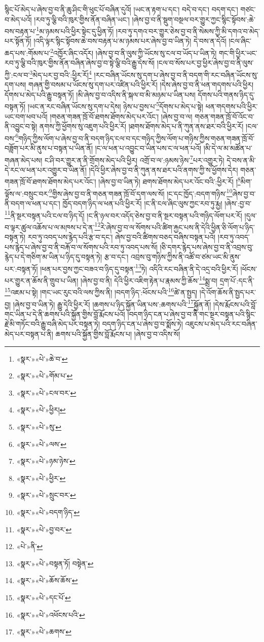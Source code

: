 སྙིང་པོ་མེད་པ་ཞེས་བྱ་བ་ནི་ཆུ་ཤིང་གི་ཕུང་པོ་བཞིན་དུའོ། །ཡང་ན་རྟག་པ་དང་། བདེ་བ་དང་། བདག་དང་། གཙང་བ་མེད་པའོ། །རབ་ཏུ་ལྕི་བའི་ཁུར་གྱིས་ནོན་བཞིན་ཡང་། །ཞེས་བྱ་བ་ནི་སྡུག་བསྔལ་བར་གྱུར་ཀྱང་སྙིང་སྟོབས་:ཆེ་བས་བརྟན་པ་\footnote{«སྣར་»«པེ་»ཆེ་བ་}མ་ཉམས་པའི་ཕྱིར་སྟེང་དུ་ཕྱིན་ཏོ། །རབ་ཏུ་དགའ་བར་གྱུར་ཅེས་བྱ་བ་ནི་སེམས་ཀྱི་མི་དགའ་བ་མེད་པར་སྟོན་ཏོ། །འདི་ལྟར་སྙིང་སྟོབས་ཆེ་བས་བརྟན་པ་མ་ཉམས་པར་ཞེས་བྱ་བ་ཡིན་ཏེ། དེ་བས་ན་དེའོ། །ངལ་ཞིང་ཆད་པས་:གོམས་པ་\footnote{«སྣར་»«པེ་»གོམ་པ་}འཁྱོར་ཞིང་འདོར། །ཞེས་བྱ་བ་ནི་ལུས་ཀྱི་ཡོངས་སུ་ངལ་བ་ཡོད་པ་ཡིན་ཏེ། གང་གི་ཕྱིར་ཡང་རབ་ཏུ་ལྕི་བའི་ཁུར་གྱིས་ནོན་བཞིན་ཞེས་བྱ་བ་སྟེ་ལྕི་བའི་རྒྱུ་དེས་སོ། །ངལ་བ་སོས་པར་བྱ་ཕྱིར་ཞེས་བྱ་བ་ནི་ལུས་ཀྱི་:ངལ་བ་\footnote{«སྣར་»«པེ་»ངལ་བར་}མེད་པར་བྱ་བའི་:ཕྱིར་རོ།\footnote{«སྣར་»«པེ་»ཕྱིར།} །རང་བཞིན་ཡོངས་སུ་དག་པ་ཞེས་བྱ་བ་ནི་བདག་གི་རང་བཞིན་ཡོངས་སུ་དག་པས། གཞན་གྱི་བསམ་པ་ཡོངས་སུ་དག་པར་འཛིན་པའི་ཕྱིར་རོ། །དེས་ཞེས་བྱ་བ་ནི་ཕན་གདགས་པའི་ཕྱིར། དོགས་པ་མེད་པའི་རྒྱུ་བསྟན་ཏོ། །མི་ཞེས་བྱ་བ་འདིས་ནི་སྐལ་བ་མི་མཉམ་པ་ཡིན་པས། དོགས་པའི་གནས་ཉིད་དུ་བསྟན་ཏོ། །ཡང་ན་རང་བཞིན་ཡོངས་སུ་དག་པ་དེས། ཉེས་པ་བྱས་པ་\footnote{«སྣར་»«པེ་»སུ་}དོགས་པ་མེད་པ་སྟེ། ཕན་གདགས་པའི་ཕྱིར་ཡང་བག་ཕབ་པའོ། །གཅན་གཟན་ཁྲོ་བོ་ཐགས་ཐོགས་མེད་པར་འོང་། །ཞེས་བྱ་བ་ལ། གཅན་གཟན་ཁྲོ་བོ་འོང་བ་ནི་འབྱུང་བ་སྟེ། ནགས་ཀྱི་ཕྱོགས་སུ་འཇུག་པའི་ཕྱིར་རོ། །ཐགས་ཐོགས་མེད་པ་ནི་ཀུན་ནས་ཐར་བའི་ཕྱིར་རོ། །ངལ་བས་\footnote{«སྣར་»«པེ་»ལས་}གཉིད་ཀྱིས་ལོག་པ་ཞེས་བྱ་བ་ནི་བདག་ཉིད་ངལ་བ་དང་གཉིད་ཀྱིས་ལོག་པ་གཉིས་ཀྱིས་གཅན་གཟན་ཁྲོ་བོ་བཟློག་པར་མི་ནུས་པ་བསྟན་པ་ཡིན་ནོ། །ང་ལ་ཕན་པ་འབྱུང་བ་ཡིན་པས་ང་ལ་ཕན་པའོ། །མི་དེ་ལ་མ་མཚོན་པ་གཞན་མེད་པས། ང་ཤི་བར་གྱུར་ན་ནི་གྲོགས་མེད་པའི་ཕྱིར། འགྲོ་བ་ལ་:ཉམས་ཉེས་\footnote{«སྣར་»«པེ་»ཉམ་ཉེས་}པར་འགྱུར་ཏེ། དེ་བས་ན་མི་དེ་རང་ལ་ཕན་པར་འགྱུར་བ་ཡིན་ནོ། །དེའི་ཕྱིར་ཞེས་བྱ་བ་ནི་ཀུན་ནས་ཐར་པའི་ནགས་ཀྱི་ས་ཕྱོགས་དེར། གཅན་གཟན་ཁྲོ་བོ་ཐགས་ཐོགས་མེད་པར་འོང་། །ཞེས་བྱ་བ་ཡིན་ཏེ། ཐགས་ཐོགས་མེད་པར་འོང་བའི་:ཕྱིར་རོ། །\footnote{«སྣར་»«པེ་»ཕྱིར་}མིག་ལྟོས་ལ་:བསྲུང་བར་\footnote{«སྣར་»«པེ་»སྲུང་བར་}གྱིས་ཞེས་བྱ་བ་ནི་གཅན་གཟན་ཁྲོ་བོ་དག་ལས་སོ། །ང་དང་ཁྱོད་:བདག་གཉིས་\footnote{«སྣར་»«པེ་»བདག་ཉིད་}ཞེས་བྱ་བ་ནི་བདག་ལ་ཕན་པ་དང་། ཁྱོད་བདག་ཉིད་ལ་ཕན་པའི་ཕྱིར་རོ། །ང་ནི་ངལ་ཞིང་ལུས་ཀྱང་རབ་ཏུ་རྨྱ། །ཞེས་:བྱ་བ་\footnote{«སྣར་»«པེ་»བྱ་བར་}ནི་སྔར་བསྟན་པའི་ངལ་བ་ཉིད་དོ། །ང་ནི་ཉལ་བར་འདོད་ཅེས་བྱ་བ་ནི་སྔར་བསྟན་པའི་གཉིད་ལོག་པར་རོ། །དུལ་བ་ལྟར་ཚུལ་འཆོས་པ་ལ་མཁས་པ་དེ་ན་\footnote{«པེ་»ནི་}རེ་ཞེས་བྱ་བ་ལ་སོགས་པའི་ཚིག་རྐྱང་པས་ནི་དེའི་ཕྱིན་ཅི་ལོག་པ་ཉིད་བསྟན་ཏེ། རབ་ཏུ་འབད་པས་རྙེད་པའི་རྩ་བ་དང་། ཞེས་བྱ་བའི་ཚིགས་བཅད་བཞིས་བསྟན་པའོ། །རབ་ཏུ་འབད་པས་རྙེད་པ་ཞེས་བྱ་བ་ནི་བརྐོ་བ་ལ་སོགས་པའི་རབ་ཏུ་འབད་པས་སོ། །ཅི་དགར་རྙེད་པས་ཞེས་བྱ་བ་ནི་འབྲས་བུ་རྙེད་པ་དེ་གཅིག་མ་ཡིན་པ་ཉིད་དུ་བསྟན་ཏེ། རྩ་བ་དང་། འབྲས་བུ་གཉིས་ཀྱིས་ནི་འཚོ་བ་ཙམ་ཡང་མི་ནུས་པར་:བསྟན་ཏོ། །ཕན་པར་བྱས་ཀྱང་བཟའ་བ་ཉིད་དུ་བསྟན་\footnote{«སྣར་»«པེ་»བསྟན་ཏོ། བསྟེན་}ཏེ། འདིའི་རང་བཞིན་ནི་དེ་འདྲ་བའི་ཕྱིར་རོ། །ཕོངས་པར་གྱུར་ན་ཆོས་ནི་གྲུབ་པ་ཡིན། །ཞེས་བྱ་བ་ནི། དེའི་ཕྱིར་འཇིག་རྟེན་པ་རྣམས་ཀྱི་ཆོས་\footnote{«སྣར་»«པེ་»ཆོས་ཆོས་}སྨྲ་བ། དྲག་པོ་:དང་ནི་\footnote{«སྣར་»«པེ་»དང་པོ་}འཇམ་པ་སྟེ། །གང་ཡང་རུང་བའི་ལས་ཀྱིས་ནི། །བདག་ཉིད་:ཕོངས་པའི་\footnote{«སྣར་»«པེ་»འཕོངས་པའི་}ཚེ་ན་སྤྱད། །དེ་འོག་ཆོས་ནི་སྤྱད་པར་བྱ། །ཞེས་བྱ་བ་ཡིན་ཏེ། རྒྱུ་དེའི་ཕྱིར་རོ། །ཆགས་པ་ཉིད་སྐྱོན་ཡིན་པས་:ཆགས་པའི་\footnote{«སྣར་»«པེ་»ཆགས་}སྐྱོན་ནོ། །དེས་རྨོངས་པའི་བློ་གང་ཡིན་པ་དེ་ནི་ཆགས་པའི་སྐྱོན་གྱིས་བློ་རྨོངས་པའོ། །བདག་ཉིད་ངན་པ་ཞེས་བྱ་བ་ནི་གང་སྔར་བསྟན་པའི་སྙིང་རྗེ་མི་གཏོང་བའི་རྒྱུ་བཞི་མེད་པར་བསྟན་ཏེ། བདག་ཉིད་ངན་པ་ཞེས་བྱ་བ་སྨོས་ཏེ། འཇུངས་པ་མེད་པའི་རང་བཞིན་མེད་པར་བསྟན་པ་ནི། ཆགས་པའི་སྐྱོན་གྱིས་བློ་རྨོངས་པ། །ཞེས་བྱ་བ་འདིས་སོ། 